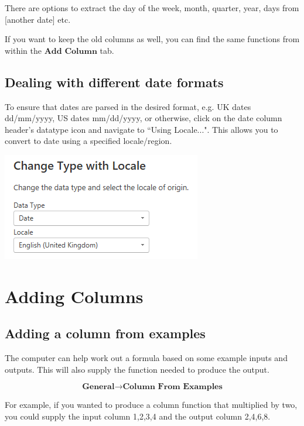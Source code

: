 \documentclass[10pt, openany, twocolumn]{book}
\begin{document}
There are options to extract the day of the week, month, quarter, year, days from [another date] etc.

\begin{tcolorbox}[colback=yellow!2!white, colframe=yellow!60!gray]
If you want to keep the old columns as well, you can find the same functions from within the $\textbf{Add Column}$ tab.
\end{tcolorbox}


\subsection*{Dealing with different date formats}

To ensure that dates are parsed in the desired format, e.g. UK dates dd/mm/yyyy, US dates mm/dd/yyyy, or otherwise, click on the date column header's datatype icon and navigate to ``Using Locale...". This allows you to convert to date using a specified locale/region.
\begin{center}
    \includegraphics[width = 0.75\columnwidth]{images/Locale.png}
\end{center}

\section{Adding Columns}

\subsection*{Adding a column from examples} 

The computer can help work out a formula based on some example inputs and outputs. This will also supply the function needed to produce the output.

$$\textbf{General}
\rightarrow \textbf{Column From Examples}$$

For example, if you wanted to produce a column function that multiplied by two, you could supply the input column 1,2,3,4 and the output column 2,4,6,8.
\end{document}
